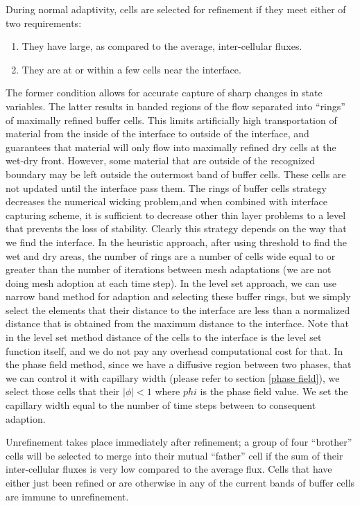 \documentclass[letterpaper,10pt]{article}
\begin{document}
During normal adaptivity, cells are selected for refinement if they meet 
either of two requirements:
\begin{enumerate} 
\item They have large, as compared to the average, inter-cellular fluxes.
\item They are at or within a few cells near the interface.
\end{enumerate}
The former condition allows for accurate capture of sharp changes in state variables. The latter results in banded regions of the flow separated into ``rings'' of maximally refined buffer cells.  This limits artificially high transportation of material from the inside of the interface to outside of the interface, and guarantees that material will only flow into maximally refined dry cells at the wet-dry front.  
However, some material that are outside of the recognized boundary may be left outside the outermost band of buffer cells. These cells are not updated until the interface pass them.
The rings of buffer cells strategy decreases the numerical wicking problem,and when combined with interface capturing scheme, it is sufficient to decrease other thin layer problems to a level that prevents the loss of stability.
Clearly this strategy depends on the way that we find the interface. In  the heuristic approach, after using threshold to find the wet and dry areas, the number of rings are a number of cells wide equal to or greater than the number of iterations between mesh adaptations (we are not doing mesh adoption at each time step). In the level set approach, we can use narrow band method for adaption and selecting these buffer rings, but we simply select the elements that their distance to the interface are less than a normalized distance that is obtained from the maximum distance to the interface. Note that in the level set method distance of the cells to the interface is the level set function itself, and we do not pay any overhead computational cost for that. In the phase field method, since we have a diffusive region between two phases, that we can control it with capillary width (please refer to section \ref{phase field}), we select those cells that their $|\phi| <1 $ where $phi$ is the phase field value. We set the capillary width equal to the number of time steps between to consequent adaption.


Unrefinement takes place immediately after refinement; a group of four ``brother'' cells will be selected to merge into their mutual ``father'' cell if the sum of their inter-cellular fluxes is very low compared to the average flux.  Cells that have either just been refined or are otherwise in any of the current bands of buffer cells are immune 
to unrefinement.  
    
\end{document}
